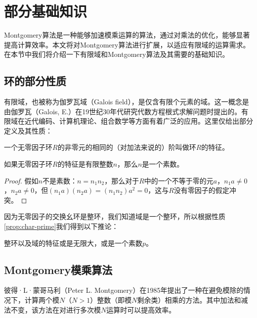 
\section{部分基础知识}

Montgomery算法是一种能够加速模乘运算的算法，通过对乘法的优化，能够显著提高计算效率。本文将对Montgomery算法进行扩展，以适应有限域的运算需求。在本节中我们将介绍一下有限域和Montgomery算法及其需要的基础知识。

\subsection{环的部分性质}

有限域，也被称为伽罗瓦域（Galois field），是仅含有限个元素的域。这一概念是由伽罗瓦（Galois, E.）在19世纪30年代研究代数方程根式求解问题时提出的。有限域在近代编码、计算机理论、组合数学等方面有着广泛的应用。这里仅给出部分定义及其性质：

\begin{definition}\label{def:characteristic}
	一个无零因子环$R$的非零元的相同的（对加法来说的）阶叫做环$R$的特征\cite{zhang1978}。
\end{definition}

\begin{property}\label{prop:char-prime}
	如果无零因子环$R$的特征是有限整数$n$，那么$n$是一个素数。
\end{property}

\begin{proof}
	假如$n$不是素数：$n = n_1 n_2$，那么对于$R$中的一个不等于零的元$a$，$n_1 a \neq 0$，$n_2 a \neq 0$，但$(n_1 a)(n_2 a) = (n_1 n_2) a^2 = 0$，这与$R$没有零因子的假定冲突。\qedhere
\end{proof}

因为无零因子的交换幺环是整环，我们知道域是一个整环，所以根据性质\ref{prop:char-prime}我们得到以下推论：

\begin{property}\label{prop:field-char}
	整环以及域的特征或是无限大，或是一个素数$p$。
\end{property}

\subsection{Montgomery模乘算法}

彼得·L·蒙哥马利（Peter L. Montgomery）在1985年提出了一种在避免模除的情况下，计算两个模$N$（$N>1$）整数（即模$N$剩余类）相乘的方法\cite{montgomery1985}。其中加法和减法不变，该方法在对进行多次模$N$运算时可以提高效率。

